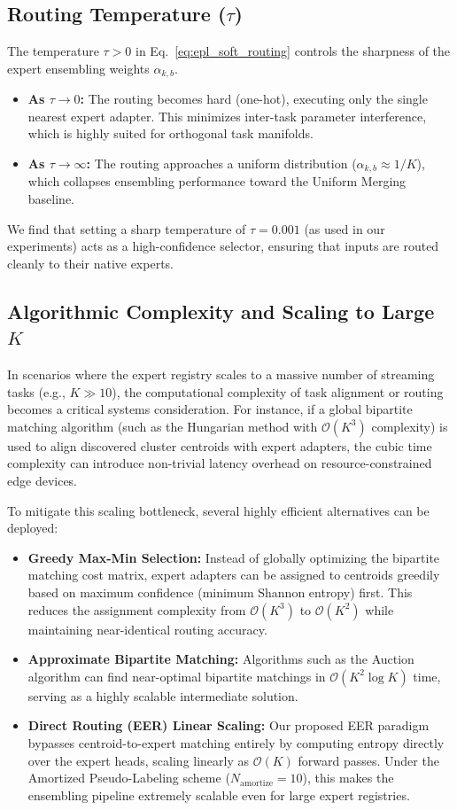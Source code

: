 \documentclass{article}
\theoremstyle{plain}
\theoremstyle{definition}
\theoremstyle{remark}
\begin{document}
\subsection{Routing Temperature ($\tau$)}
The temperature $\tau > 0$ in Eq.~\ref{eq:epl_soft_routing} controls the sharpness of the expert ensembling weights $\alpha_{k, b}$.
\begin{itemize}
    \item \textbf{As $\tau \to 0$:} The routing becomes hard (one-hot), executing only the single nearest expert adapter. This minimizes inter-task parameter interference, which is highly suited for orthogonal task manifolds.
    \item \textbf{As $\tau \to \infty$:} The routing approaches a uniform distribution ($\alpha_{k, b} \approx 1/K$), which collapses ensembling performance toward the Uniform Merging baseline.
\end{itemize}
We find that setting a sharp temperature of $\tau = 0.001$ (as used in our experiments) acts as a high-confidence selector, ensuring that inputs are routed cleanly to their native experts.

\subsection{Algorithmic Complexity and Scaling to Large $K$}
In scenarios where the expert registry scales to a massive number of streaming tasks (e.g., $K \gg 10$), the computational complexity of task alignment or routing becomes a critical systems consideration. For instance, if a global bipartite matching algorithm (such as the Hungarian method with $\mathcal{O}(K^3)$ complexity) is used to align discovered cluster centroids with expert adapters, the cubic time complexity can introduce non-trivial latency overhead on resource-constrained edge devices. 

To mitigate this scaling bottleneck, several highly efficient alternatives can be deployed:
\begin{itemize}
    \item \textbf{Greedy Max-Min Selection:} Instead of globally optimizing the bipartite matching cost matrix, expert adapters can be assigned to centroids greedily based on maximum confidence (minimum Shannon entropy) first. This reduces the assignment complexity from $\mathcal{O}(K^3)$ to $\mathcal{O}(K^2)$ while maintaining near-identical routing accuracy.
    \item \textbf{Approximate Bipartite Matching:} Algorithms such as the Auction algorithm can find near-optimal bipartite matchings in $\mathcal{O}(K^2 \log K)$ time, serving as a highly scalable intermediate solution.
    \item \textbf{Direct Routing (EER) Linear Scaling:} Our proposed EER paradigm bypasses centroid-to-expert matching entirely by computing entropy directly over the expert heads, scaling linearly as $\mathcal{O}(K)$ forward passes. Under the Amortized Pseudo-Labeling scheme ($N_{\text{amortize}} = 10$), this makes the ensembling pipeline extremely scalable even for large expert registries.
\end{itemize}
\end{document}

